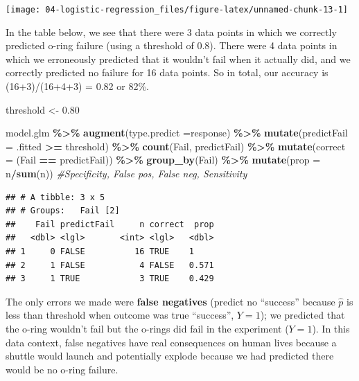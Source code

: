 \documentclass[
]{book}
\newenvironment{Shaded}{\begin{snugshade}}{\end{snugshade}}
\newcommand{\AttributeTok}[1]{\textcolor[rgb]{0.13,0.29,0.53}{#1}}
\newcommand{\CommentTok}[1]{\textcolor[rgb]{0.56,0.35,0.01}{\textit{#1}}}
\newcommand{\FloatTok}[1]{\textcolor[rgb]{0.00,0.00,0.81}{#1}}
\newcommand{\FunctionTok}[1]{\textcolor[rgb]{0.13,0.29,0.53}{\textbf{#1}}}
\newcommand{\NormalTok}[1]{#1}
\newcommand{\OtherTok}[1]{\textcolor[rgb]{0.56,0.35,0.01}{#1}}
\newcommand{\SpecialCharTok}[1]{\textcolor[rgb]{0.81,0.36,0.00}{\textbf{#1}}}
\newcommand{\StringTok}[1]{\textcolor[rgb]{0.31,0.60,0.02}{#1}}
\begin{document}
\begin{center}\texttt{[image: 04-logistic-regression\_files/figure-latex/unnamed-chunk-13-1]} \end{center}

In the table below, we see that there were 3 data points in which we correctly predicted o-ring failure (using a threshold of 0.8). There were 4 data points in which we erroneously predicted that it wouldn't fail when it actually did, and we correctly predicted no failure for 16 data points. So in total, our accuracy is (16+3)/(16+4+3) = 0.82 or 82\%.

\begin{Shaded}
\begin{Highlighting}[]
\NormalTok{threshold }\OtherTok{\textless{}{-}} \FloatTok{0.80}

\NormalTok{model.glm }\SpecialCharTok{\%\textgreater{}\%}
  \FunctionTok{augment}\NormalTok{(}\AttributeTok{type.predict =}\StringTok{\textquotesingle{}response\textquotesingle{}}\NormalTok{) }\SpecialCharTok{\%\textgreater{}\%}
  \FunctionTok{mutate}\NormalTok{(}\AttributeTok{predictFail =}\NormalTok{ .fitted }\SpecialCharTok{\textgreater{}=}\NormalTok{ threshold) }\SpecialCharTok{\%\textgreater{}\%}
  \FunctionTok{count}\NormalTok{(Fail, predictFail) }\SpecialCharTok{\%\textgreater{}\%}
  \FunctionTok{mutate}\NormalTok{(}\AttributeTok{correct =}\NormalTok{ (Fail }\SpecialCharTok{==}\NormalTok{ predictFail)) }\SpecialCharTok{\%\textgreater{}\%}
  \FunctionTok{group\_by}\NormalTok{(Fail) }\SpecialCharTok{\%\textgreater{}\%}
  \FunctionTok{mutate}\NormalTok{(}\AttributeTok{prop =}\NormalTok{ n}\SpecialCharTok{/}\FunctionTok{sum}\NormalTok{(n)) }\CommentTok{\#Specificity, False pos, False neg, Sensitivity }
\end{Highlighting}
\end{Shaded}

\begin{verbatim}
## # A tibble: 3 x 5
## # Groups:   Fail [2]
##    Fail predictFail     n correct  prop
##   <dbl> <lgl>       <int> <lgl>   <dbl>
## 1     0 FALSE          16 TRUE    1    
## 2     1 FALSE           4 FALSE   0.571
## 3     1 TRUE            3 TRUE    0.429
\end{verbatim}

The only errors we made were \textbf{false negatives} (predict no ``success'' because \(\hat{p}\) is less than threshold when outcome was true ``success'', \(Y=1\)); we predicted that the o-ring wouldn't fail but the o-rings did fail in the experiment (\(Y=1\)). In this data context, false negatives have real consequences on human lives because a shuttle would launch and potentially explode because we had predicted there would be no o-ring failure.
\end{document}
